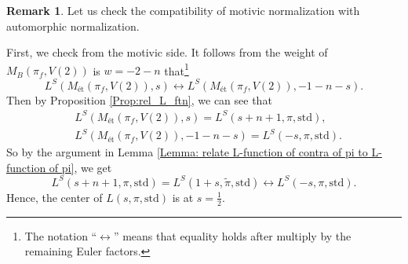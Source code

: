 \documentclass[11pt, a4paper]{amsart}
\theoremstyle{plain}
\theoremstyle{definition}
\newtheorem{remark}[theorem]{Remark}
\numberwithin{equation}{section}
\begin{document}
\begin{remark}
    \par Let us check the compatibility of motivic normalization with automorphic normalization. 
    \par First, we check from the motivic side. It follows from the weight of $M_{B}(\pi_f, V(2))$ is $w = -2 - n$ that\footnote{The notation ``$\leftrightarrow$'' means that equality holds after multiply by the remaining Euler factors.}
    \begin{equation*}
        L^{S}(M_{\text{\'{e}t}}(\pi_f, V(2)), s) \leftrightarrow L^{S}(M_{\text{\'{e}t}}(\pi_f, V(2)), -1 - n - s). 
    \end{equation*}
    Then by Proposition \ref{Prop:rel_L_ftn}, we can see that  
    \begin{align*}
        & L^{S}(M_{\text{\'{e}t}}(\pi_f, V(2)), s) = L^{S}(s + n + 1, \pi, \mathrm{std}), \\ 
        & L^{S}(M_{\text{\'{e}t}}(\pi_f, V(2)), -1 - n - s) = L^{S}(-s, \pi, \mathrm{std}). 
    \end{align*}
    So by the  argument in Lemma \ref{Lemma: relate L-function of contra of pi to L-function of pi}, we get
    \begin{equation}
    \label{eq: ftn_motiv}
        L^{S}(s + n + 1, \pi, \mathrm{std}) = L^{S}(1 + s, \tilde{\pi}, \mathrm{std}) \leftrightarrow L^{S}(-s, \pi, \mathrm{std}).
    \end{equation}
    Hence, the center of $L(s, \pi, \mathrm{std})$ is at $s = \frac{1}{2}$. 
    

\end{remark}
\end{document}
